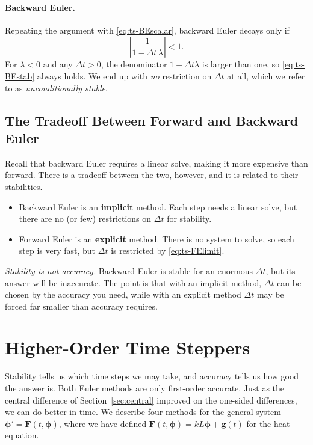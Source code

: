 \paragraph{Backward Euler.} Repeating the argument with \eqref{eq:ts-BEscalar}, backward Euler decays only if
\begin{equation}
  \left|\frac{1}{1 - \Delta t\,\lambda}\right| < 1.
  \label{eq:ts-BEstab}
\end{equation}
For $\lambda<0$ and any $\Delta t > 0$, the denominator $1 - \Delta t\lambda$ is
larger than one, so \eqref{eq:ts-BEstab} always holds. We end up with
\emph{no} restriction on $\Delta t$ at all, which we refer to as
\emph{unconditionally stable}.


\subsection{The Tradeoff Between Forward and Backward Euler}
\label{sec:ts-tradeoff}

Recall that backward Euler requires a linear solve, making it more expensive than forward. There is a tradeoff between the two, however, and it is related to their stabilities.
\begin{itemize}
  \item Backward Euler is an \textbf{implicit} method. Each step needs a linear solve, but there are no (or few) restrictions on $\Delta t$ for stability.
  \item Forward Euler is an \textbf{explicit} method. There is no system to solve, so each step is very fast, but $\Delta t$ is restricted by \eqref{eq:ts-FElimit}.
\end{itemize}

\textit{Stability is not accuracy.} Backward Euler is stable for an enormous $\Delta t$, but
its answer will be inaccurate. The point is that with an implicit
method, $\Delta t$ can be chosen by the accuracy you need, while with an explicit
method $\Delta t$ may be forced far smaller than accuracy requires.




\section{Higher-Order Time Steppers}
\label{sec:ts-higher}

Stability tells us which time steps we may take, and accuracy tells us how good
the answer is. Both Euler methods are only first-order accurate. Just as the central difference of
Section~\ref{sec:central} improved on the one-sided differences, we can do better
in time. We describe four methods for the general system
$\boldsymbol{\phi}' = \mathbf{F}(t,\boldsymbol{\phi})$, where we have defined $\mathbf{F}(t,\boldsymbol{\phi}) = kL\boldsymbol{\phi} + \mathbf{g}(t)$ for the heat equation.


